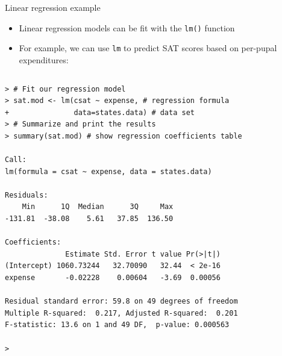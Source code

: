 \documentclass[table,smaller]{beamer}
\begin{document}
\begin{frame}[fragile,label=sec-2-3]{Linear regression example}
 \begin{itemize}
\item Linear regression models can be fit with the \texttt{lm()} function
\item For example, we can use \texttt{lm} to predict SAT scores based on per-pupal expenditures:
\end{itemize}

\vspace{-.5em}
\begin{columns}
\begin{block}{}
\begin{verbatim}
> # Fit our regression model
> sat.mod <- lm(csat ~ expense, # regression formula
+               data=states.data) # data set
> # Summarize and print the results
> summary(sat.mod) # show regression coefficients table

Call:
lm(formula = csat ~ expense, data = states.data)

Residuals:
    Min      1Q  Median      3Q     Max 
-131.81  -38.08    5.61   37.85  136.50 

Coefficients:
              Estimate Std. Error t value Pr(>|t|)
(Intercept) 1060.73244   32.70090   32.44  < 2e-16
expense       -0.02228    0.00604   -3.69  0.00056

Residual standard error: 59.8 on 49 degrees of freedom
Multiple R-squared:  0.217,	Adjusted R-squared:  0.201 
F-statistic: 13.6 on 1 and 49 DF,  p-value: 0.000563

>
\end{verbatim}
\end{block}
\end{columns}
\vspace{.5em}
\end{frame}
\end{document}
